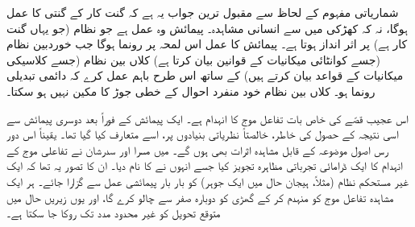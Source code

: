 شماریاتی مفہوم کے لحاظ سے مقبول ترین جواب یہ ہے کہ گنت کار کے گنتی کا عمل  ہوگا، نہ کہ کھڑکی میں سے انسانی مشاہدہ۔ پیمائش وہ عمل ہے جو  نظام (جو یہاں گنت کار ہے) پر اثر انداز ہوتا ہے۔ پیمائش کا عمل اس لمحہ پر رونما ہوگا جب خوردبین نظام (جسے کوانٹائی میکانیات کے قوانین بیان کرتا ہے) کلاں بین نظام (جسے کلاسیکی میکانیات کے قواعد بیان کرتے ہیں) کے ساتھ اس طرح باہم عمل کرے کہ دائمی تبدیلی رونما ہو۔ کلاں بین نظام خود منفرد احوال کے خطی جوڑ کا مکین نہیں ہو سکتا۔

اس عجیب قصّے کی خاص بات تفاعل موج کا انہدام ہے۔ ایک پیمائش کے فوراً بعد دوسری پیمائش سے اسی نتیجہ کے حصول کی خاطر، خالصتاً نظریاتی بنیادوں پر، اسے متعارف کیا گیا تھا۔ یقیناً اس دور رس اصول موضوعہ کے قابل مشاہدہ اثرات بھی ہوں گے۔  میں مسرا اور سدرشان نے تفاعلی موج کے انہدام کا ایک ڈرامائی تجرباتی مظاہرہ تجویز کیا جسے انہوں نے  کا نام دیا۔ ان کا تصور یہ تھا کہ ایک غیر مستحکم نظام (مثلاً، ہیجان حال میں ایک جوہر) کو بار بار پیمائشی عمل سے گزارا جائے۔ ہر ایک مشاہدہ تفاعل موج کو منہدم کر کے گھڑی کو دوبارہ صفر سے چالو کرے گا، اور یوں زیریں حال میں متوقع تحویل کو غیر محدود  مدد تک روکا جا سکتا ہے۔

